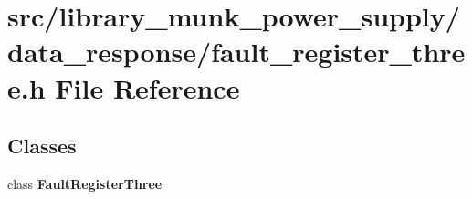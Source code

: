 \section{src/library\+\_\+munk\+\_\+power\+\_\+supply/data\+\_\+response/fault\+\_\+register\+\_\+three.h File Reference}
\label{fault__register__three_8h}
\subsection*{Classes}
\begin{DoxyCompactItemize}
\item 
class \textbf{ Fault\+Register\+Three}
\end{DoxyCompactItemize}
